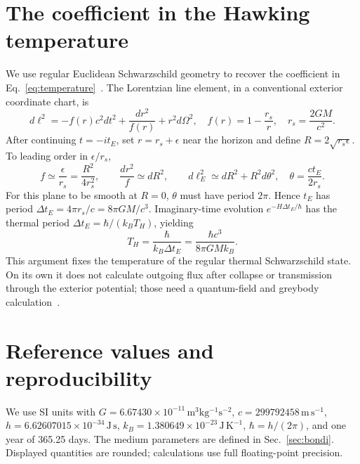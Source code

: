 \documentclass[11pt,a4paper]{article}
\begin{document}
\section{The coefficient in the Hawking temperature}\label{app:temperature}
We use regular Euclidean Schwarzschild geometry to recover the coefficient in Eq.~\eqref{eq:temperature}~\cite{gibbons,genolini}. The Lorentzian line element, in a conventional exterior coordinate chart, is
\begin{equation*}
 d\ell^2=-f(r)c^2dt^2+\frac{dr^2}{f(r)}+r^2d\Omega^2,
 \quad f(r)=1-\frac{r_s}{r},\quad r_s=\frac{2GM}{c^2}.
\end{equation*}
After continuing $t=-it_E$, set $r=r_s+\epsilon$ near the horizon and define $R=2\sqrt{r_s\epsilon}$. To leading order in $\epsilon/r_s$,
\begin{equation*}
 f\simeq\frac{\epsilon}{r_s}=\frac{R^2}{4r_s^2},\qquad
 \frac{dr^2}{f}\simeq dR^2,\qquad
 d\ell_E^2\simeq dR^2+R^2d\theta^2,
 \quad\theta=\frac{ct_E}{2r_s}.
\end{equation*}
For this plane to be smooth at $R=0$, $\theta$ must have period $2\pi$. Hence $t_E$ has period $\Delta t_E=4\pi r_s/c=8\pi GM/c^3$. Imaginary-time evolution $e^{-H\Delta t_E/\hbar}$ has the thermal period $\Delta t_E=\hbar/(k_BT_H)$, yielding
\begin{equation*}
 T_H=\frac{\hbar}{k_B\Delta t_E}=\frac{\hbar c^3}{8\pi GMk_B}.
\end{equation*}
This argument fixes the temperature of the regular thermal Schwarzschild state. On its own it does not calculate outgoing flux after collapse or transmission through the exterior potential; those need a quantum-field and greybody calculation~\cite{hawking,page}.

\section{Reference values and reproducibility}\label{app:values}
We use SI units with $G=6.67430\times10^{-11}\,\mathrm{m^3kg^{-1}s^{-2}}$, $c=299792458\,\mathrm{m\,s^{-1}}$, $h=6.62607015\times10^{-34}\,\mathrm{J\,s}$, $k_B=1.380649\times10^{-23}\,\mathrm{J\,K^{-1}}$, $\hbar=h/(2\pi)$, and one year of 365.25 days. The medium parameters are defined in Sec.~\ref{sec:bondi}. Displayed quantities are rounded; calculations use full floating-point precision.
\end{document}
